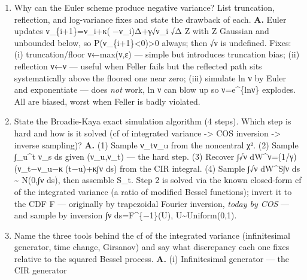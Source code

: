 \documentclass[
  11pt,
]{article}
\begin{document}
\begin{enumerate}
  negative rho make it worse? \textbf{A.} Same cumulant rule
  {[}a,b{]}=c\_1±L√(c\_2+√c\_4), with c\_1,c\_2,c\_4 of ln S\_T obtained
  by differentiating log φ at ω=0. Danger at short τ: c\_2 (the
  variance) is small, so the box collapses toward c\_1; if the higher
  cumulants are under-weighted the range chops off mass and COS loses
  spectral accuracy --- adding terms N does not help (it is a range, not
  a series, error). Negative ρ produces a heavy left tail (skew) plus γ
  fattens the tails, so the true support is wider than a c\_2-only box;
  the fix is a larger L (10--12) and keeping the √c\_4 term, not the
  BS-style L=8--10 with c\_4 ignored. This is the Assignment-2 bug
  generalised.
\item
  Why can the Euler scheme produce negative variance? List truncation,
  reflection, and log-variance fixes and state the drawback of each.
  \textbf{A.} Euler updates ν\_\{i+1\}=ν\_i+κ(−ν\_i)Δ+γ√ν\_i √Δ Z with
  Z Gaussian and unbounded below, so
  P(ν\_\{i+1\}\textless0)\textgreater0 always; then √ν is undefined.
  Fixes: (i) truncation/floor ν←max(ν,ε) --- simple but introduces
  truncation bias; (ii) reflection ν←\textbar ν\textbar{} --- useful
  when Feller fails but the reflected path sits systematically above the
  floored one near zero; (iii) simulate ln ν by Euler and exponentiate
  --- does \emph{not} work, ln ν can blow up so ν=e\^{}\{lnν\} explodes.
  All are biased, worst when Feller is badly violated.
\item
  State the Broadie-Kaya exact simulation algorithm (4 steps). Which
  step is hard and how is it solved (cf of integrated variance
  -\textgreater{} COS inversion -\textgreater{} inverse sampling)?
  \textbf{A.} (1) Sample ν\_t\textbar ν\_u from the noncentral χ². (2)
  Sample ∫\_u\^{}t ν\_s ds given (ν\_u,ν\_t) --- the hard step. (3)
  Recover ∫√ν dW\^{}ν=(1/γ)(ν\_t−ν\_u−κ(t−u)+κ∫ν ds) from the CIR
  integral. (4) Sample ∫√ν dW\^{}S\textbar∫ν ds \textasciitilde{} N(0,∫ν
  ds), then assemble S\_t. Step 2 is solved via the known closed-form cf
  of the integrated variance (a ratio of modified Bessel functions);
  invert it to the CDF F --- originally by trapezoidal Fourier
  inversion, \emph{today by COS} --- and sample by inversion ∫ν
  ds=F\^{}\{−1\}(U), U\textasciitilde Uniform(0,1).
\item
  Name the three tools behind the cf of the integrated variance
  (infinitesimal generator, time change, Girsanov) and say what
  discrepancy each one fixes relative to the squared Bessel process.
  \textbf{A.} (i) Infinitesimal generator --- the CIR generator

\end{enumerate}
\end{document}
